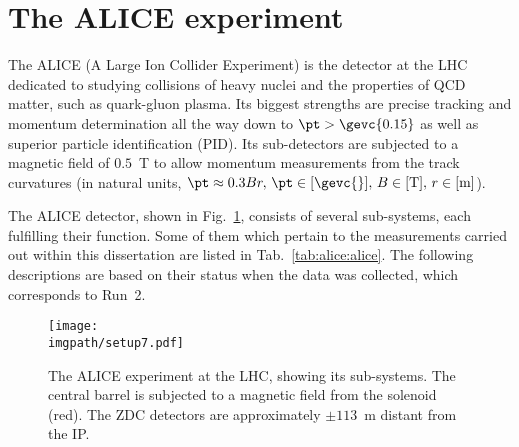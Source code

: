 \section{The ALICE experiment}

The ALICE (A Large Ion Collider Experiment) \cite{collaborationALICEExperimentCERN2008, PerformanceALICEExperiment2014} is the detector at the LHC dedicated to studying collisions of heavy nuclei and the properties of QCD matter, such as quark-gluon plasma. Its biggest strengths are precise tracking and momentum determination all the way down to $\pt>\gevc{0.15}$ as well as superior particle identification (PID). Its sub-detectors are subjected to a magnetic field of $0.5$~T to allow momentum measurements from the track curvatures (in natural units, $\pt \approx 0.3 B r, \, \pt \in [\gevc{}], \, B \in [\mathrm{T}], \, r \in [\mathrm{m}]$).

The ALICE detector, shown in Fig.~\ref{fig:alice:alice}, consists of several sub-systems, each fulfilling their function. Some of them which pertain to the measurements carried out within this dissertation are listed in Tab.~\ref{tab:alice:alice}. The following descriptions are based on their status when the data was collected, which corresponds to Run~2.

\begin{figure}[H]
\centering%
\texttt{[image: \\imgpath/setup7.pdf]}
\caption{The ALICE experiment at the LHC, showing its sub-systems. The central barrel is subjected to a magnetic field from the solenoid (red). The ZDC detectors are approximately $\pm 113$~m distant from the IP. \cite{alicecollaborationPerformanceALICEExperiment2014}}
\label{fig:alice:alice}
\end{figure}

